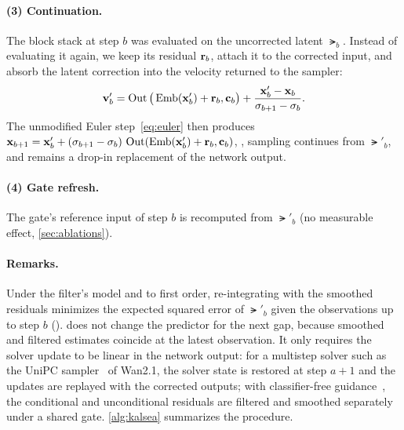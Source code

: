 \paragraph{(3) Continuation.}
The block stack at step $b$ was evaluated on the uncorrected latent $\lat_b$. Instead of evaluating it again, we keep
its residual $\mathbf{r}_b$, attach it to the corrected input, and absorb the latent correction into the velocity returned
to the sampler:
\begin{equation}
  \mathbf{v}'_b=\operatorname{Out}\big(\operatorname{Emb}(\mathbf{x}'_b)+\mathbf{r}_b,\mathbf{c}_b\big)+\frac{\mathbf{x}'_b-\mathbf{x}_b}{\sigma_{b+1}-\sigma_b}.
  \label{eq:offset}
\end{equation}
The unmodified Euler step~\eqref{eq:euler} then produces
$\mathbf{x}_{b+1}=\mathbf{x}'_b+(\sigma_{b+1}-\sigma_b)\,\operatorname{Out}(\operatorname{Emb}(\mathbf{x}'_b)+\mathbf{r}_b,\mathbf{c}_b)$, \ie, sampling continues from
$\lat'_b$, and \pcgs remains a drop-in replacement of the network output.

\paragraph{(4) Gate refresh.}
The gate's reference input of step $b$ is recomputed from $\lat'_b$ (no measurable effect, \cref{sec:ablations}).

\paragraph{Remarks.}
Under the filter's model and to first order, re-integrating with the smoothed residuals minimizes the expected squared
error of $\lat'_b$ given the observations up to step $b$ (). \pcgs does not change the predictor for the next gap, because smoothed and filtered estimates coincide at the latest
observation. It only requires the solver update to be linear in the network output: for a multistep solver such as
the UniPC sampler~\cite{zhao2023unipc} of Wan2.1, the solver state is restored at step $a{+}1$ and the updates are
replayed with the corrected outputs; with classifier-free guidance~\cite{ho2022cfg}, the conditional and
unconditional residuals are filtered and smoothed separately under a shared gate. \cref{alg:kalsea} summarizes the
procedure.

